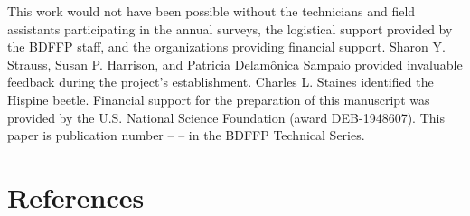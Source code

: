 \documentclass[
  12pt,
  man, donotrepeattitle]{apa6}
\begin{document}
\noindent  
This work would not have been possible without the technicians and field assistants participating in the annual surveys, the logistical support provided by the BDFFP staff, and the organizations providing financial support. Sharon Y. Strauss, Susan P. Harrison, and Patricia Delamônica Sampaio provided invaluable feedback during the project's establishment. Charles L. Staines identified the Hispine beetle. Financial support for the preparation of this manuscript was provided by the U.S. National Science Foundation (award DEB-1948607). This paper is publication number -- -- in the BDFFP Technical Series.

\newpage

\hypertarget{references}{%
\section{References}\label{references}}

\begingroup
\setlength{\parindent}{0in}
\setlength{\leftskip}{0in}
\end{document}

